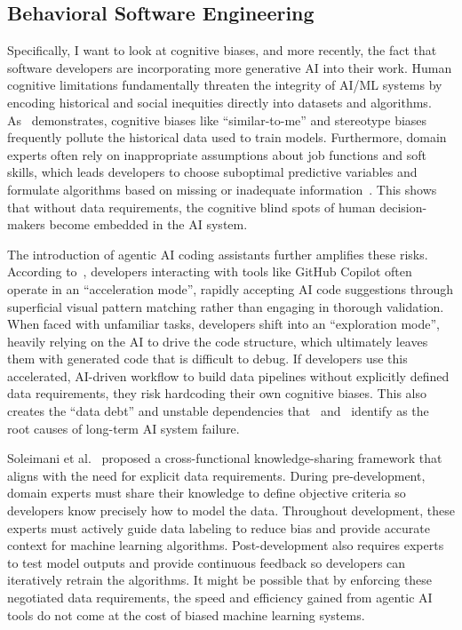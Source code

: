 \subsection{Behavioral Software Engineering}
Specifically, I want to look at cognitive biases, and more recently, the fact that software developers are incorporating more generative AI into their work. Human cognitive limitations fundamentally threaten the integrity of AI/ML systems by encoding historical and social inequities directly into datasets and algorithms. As~\cite{soleimani2021cognitive, soleimani2022mitigating} demonstrates, cognitive biases like ``similar-to-me'' and stereotype biases frequently pollute the historical data used to train models. Furthermore, domain experts often rely on inappropriate assumptions about job functions and soft skills, which leads developers to choose suboptimal predictive variables and formulate algorithms based on missing or inadequate information~\cite{soleimani2021cognitive}. This shows that without data requirements, the cognitive blind spots of human decision-makers become embedded in the AI system.

The introduction of agentic AI coding assistants further amplifies these risks. According to~\cite{barke2023grounded}, developers interacting with tools like GitHub Copilot often operate in an ``acceleration mode'', rapidly accepting AI code suggestions through superficial visual pattern matching rather than engaging in thorough validation. When faced with unfamiliar tasks, developers shift into an ``exploration mode'', heavily relying on the AI to drive the code structure, which ultimately leaves them with generated code that is difficult to debug. If developers use this accelerated, AI-driven workflow to build data pipelines without explicitly defined data requirements, they risk hardcoding their own cognitive biases. This also creates the ``data debt'' and unstable dependencies that~\cite{sculley2015hidden} and~\cite{bogner2021characterizing} identify as the root causes of long-term AI system failure.

Soleimani et al.~\cite{soleimani2022mitigating} proposed a cross-functional knowledge-sharing framework that aligns with the need for explicit data requirements. During pre-development, domain experts must share their knowledge to define objective criteria so developers know precisely how to model the data. Throughout development, these experts must actively guide data labeling to reduce bias and provide accurate context for machine learning algorithms. Post-development also requires experts to test model outputs and provide continuous feedback so developers can iteratively retrain the algorithms. It might be possible that by enforcing these negotiated data requirements, the speed and efficiency gained from agentic AI tools do not come at the cost of biased machine learning systems.


